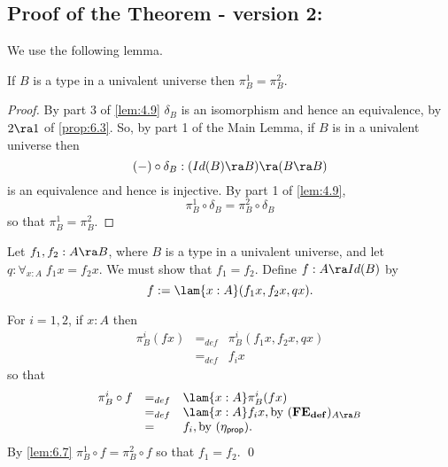 \subsection{Proof of the Theorem - version 2: } 

We use the following lemma.
\begin{lem}\label{fe:lem-projs}\label{lem:6.7}
If $B$ is a type in a univalent universe then $\pi^1_B = \pi^2_B$.
\end{lem}
\begin{proof} By part 3 of \autoref{lem:4.9} $\delta_B$ is an isomorphism and hence an equivalence, by $2\ra 1$ of \autoref{prop:6.3}.  So, by part 1 of the Main Lemma, if $B$ is in a univalent universe then
  \[ (-)\circ\delta_B : (Id(B)\ra B)\ra (B\ra B)\]
is an equivalence and hence is injective.  By part 1 of \autoref{lem:4.9},
  \[ \pi^1_B\circ\delta_B = \pi^2_B\circ\delta_B\]
so that $\pi^1_B=\pi^2_B$.
\end{proof}


Let $f_1,f_2:A\ra B$, where $B$ is a type in a univalent universe, and let 
$q:\forall_{x:A}\; f_1x=f_2x$.  We must show that $f_1=f_2$.
Define $f:A\ra Id(B)$ by
  \[ f := \lam{x:A}(f_1x,f_2x,qx).\]

For $i=1,2$, if $x:A$ then
  \[\begin{array}{lll}
\pi^i_B(fx)&=_{def}&\pi^i_B(f_1x,f_2x,qx)\\
           &=_{def}& f_ix
  \end{array}\]
so that
  \[\begin{array}{lll}
\pi^i_B\circ f&=_{def}& \lam{x:A}\pi^i_B(fx)\\
           &=_{def}& \lam{x:A}f_ix,\mbox{by } {\bf (FE_{def}})_{A\ra B}\\
           &=& f_i,\mbox{by }{(\eta_{\sf prop})}.
  \end{array}\]
By \autoref{lem:6.7} $\pi^1_B\circ f = \pi^2_B\circ f$ so that $f_1=f_2$.
\qed


